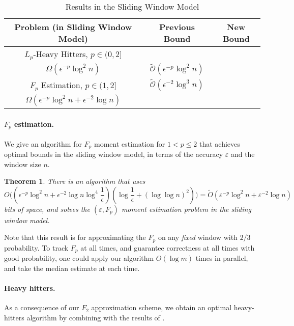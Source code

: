 \documentclass{article}
\newcommand{\eps}{\varepsilon}
\theoremstyle{plain}
\newtheorem{theorem}{Theorem}[section]
\begin{document}
\begin{table}[htbp]
\centering
\begin{tabular}{|c|c|c|}
\hline
\textbf{Problem (in Sliding Window Model)} & \textbf{Previous Bound} & \textbf{New Bound} \\
\hline
$L_p$-Heavy Hitters, $p \in (0,2]$ & \makecell{ 
$\tilde{O}(\epsilon^{-p}\log^3 n)$\\ $\Omega(\epsilon^{-p}\log^2 n)$ \cite{braverman2018nearly}} & 
$\tilde{\mathcal{O}}(\epsilon^{-p}\log^2 n)$ \\
\hline
$F_p$ Estimation, $p \in (1,2]$ & 
$\tilde{\mathcal{O}}(\epsilon^{-2}\log^3 n)$ \cite{woodruff2022tight} & \makecell{
$\tilde{O}(\epsilon^{-p}\log^2 n + \epsilon^{-2}\log n)$,\\ $\Omega(\epsilon ^ {-p} \log ^ 2n + \epsilon ^ {-2}\log n)$ }\\
\hline
\end{tabular}
\label{tab:results}
\caption{Results in the Sliding Window Model}
\end{table} 
\paragraph{$F_p$ estimation.}

We give an algorithm for $F_p$ moment estimation for $1 < p \leq 2$ that achieves optimal bounds in the sliding window model, in terms of the accuracy $\eps$ and the window size $n$.

\begin{theorem}
    There is an algorithm that uses  
    \[
    O\Big((\epsilon ^ {-p} \log ^ 2n + \epsilon ^ {-2}\log n \log ^ 4 \frac 1{\epsilon}) (\log \frac{1}{\epsilon} + (\log \log n) ^ 2)\Big)
    = \tilde{O}(\eps^{-p}\log^2 n + \eps^{-2}\log n)
    \]
    bits of space, and solves the $(\eps, F_p)$ moment estimation problem in the sliding window model. 
\end{theorem}

Note that this result is for approximating the $F_p$ on any \textit{fixed} window with $2/3$ probability.  To track $F_p$ at all times, and guarantee correctness at all times with good probability, one could apply our algorithm $O(\log m)$ times in parallel, and take the median estimate at each time.

\paragraph{Heavy hitters.}
As a consequence of our $F_2$ approximation scheme, we obtain an optimal heavy-hitters algorithm by combining with the results of \cite{braverman2018nearly}.
\end{document}
